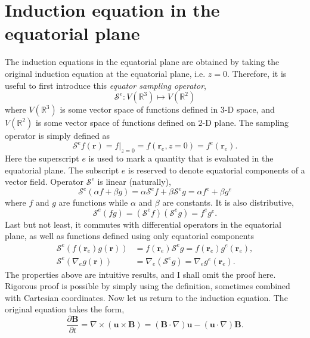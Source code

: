 \section{Induction equation in the equatorial plane}

The induction equations in the equatorial plane are obtained by taking the original induction equation at the equatorial plane, i.e. $z=0$.
Therefore, it is useful to first introduce this \textit{equator sampling operator},
\[
    \mathcal{S}^e: V(\mathbb{R}^3) \mapsto V(\mathbb{R}^2)
\]
where $V(\mathbb{R}^3)$ is some vector space of functions defined in 3-D space, and $V(\mathbb{R}^2)$ is some vector space of functions defined on 2-D plane.
The sampling operator is simply defined as
\[
    \mathcal{S}^e f(\mathbf{r}) = f|_{z=0} = f(\mathbf{r}_e, z=0) = f^e(\mathbf{r}_e).
\]
Here the superscript $e$ is used to mark a quantity that is evaluated in the equatorial plane. The subscript $e$ is reserved to denote equatorial components of a vector field.
Operator $\mathcal{S}^e$ is linear (naturally),
\[
    \mathcal{S}^e \left(\alpha f + \beta g\right) = \alpha \mathcal{S}^e f + \beta \mathcal{S}^e g = \alpha f^e + \beta g^e
\]
where $f$ and $g$ are functions while $\alpha$ and $\beta$ are constants. It is also distributive,
\[
    \mathcal{S}^e \left(f g\right) = \left(\mathcal{S}^e f\right) \left(\mathcal{S}^e g\right) = f^e g^e.
\]
Last but not least, it commutes with differential operators in the equatorial plane, as well as functions defined using only equatorial components
\[\begin{aligned}
    \mathcal{S}^e \left(f(\mathbf{r}_e) g(\mathbf{r})\right) &= f(\mathbf{r}_e) \mathcal{S}^e g = f(\mathbf{r}_e) g^e(\mathbf{r}_e), \\ 
    \mathcal{S}^e \left(\nabla_e g(\mathbf{r})\right) &= \nabla_e \left(\mathcal{S}^e g\right) = \nabla_e g^e(\mathbf{r}_e).
\end{aligned}
\]
The properties above are intuitive results, and I shall omit the proof here. Rigorous proof is possible by simply using the definition, sometimes combined with Cartesian coordinates.
Now let us return to the induction equation. The original equation takes the form,
\[
    \frac{\partial \mathbf{B}}{\partial t} = \nabla \times (\mathbf{u} \times \mathbf{B}) = \left(\mathbf{B}\cdot \nabla\right) \mathbf{u} - \left(\mathbf{u} \cdot \nabla\right) \mathbf{B}.
\]
